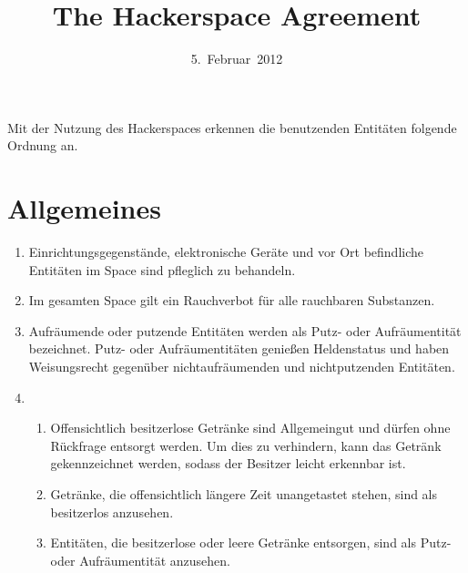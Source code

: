 \documentclass[12pt,a4paper]{scrartcl}
\title{The Hackerspace Agreement}
\date{5.~Februar~2012}
\begin{document}
\maketitle

\noindent Mit der Nutzung des Hackerspaces erkennen die benutzenden Entitäten
folgende Ordnung an.

\enlargethispage{1em}
\section{Allgemeines}
\begin{enumerate}
  \item Einrichtungsgegenstände, elektronische Geräte und vor Ort befindliche
    Entitäten im Space sind pfleglich zu behandeln.

  \item Im gesamten Space gilt ein Rauchverbot für alle rauchbaren Substanzen.

  \item Aufräumende oder putzende Entitäten werden als Putz- oder Aufräumentität
    bezeichnet. Putz- oder Aufräumentitäten genießen Heldenstatus und haben
    Weisungsrecht gegenüber nichtaufräumenden und nichtputzenden Entitäten.

  \item\begin{enumerate}
    \item Offensichtlich besitzerlose Getränke sind Allgemeingut und dürfen ohne
      Rückfrage entsorgt werden. Um dies zu verhindern, kann das Getränk
      gekennzeichnet werden, sodass der Besitzer leicht erkennbar ist.
    \item Getränke, die offensichtlich längere Zeit unangetastet stehen, sind
      als besitzerlos anzusehen.
    \item Entitäten, die besitzerlose oder leere Getränke entsorgen, sind als
      Putz- oder Aufräumentität anzusehen.
  \end{enumerate}


\end{enumerate}
\end{document}
